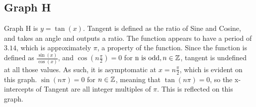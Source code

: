\subsection{Graph H}

Graph H is $y=\tan(x)$.
Tangent is defined as the ratio of Sine and Cosine, and takes an angle and outputs a ratio.
The function appears to have a period of $3.14$, which is approximately $\pi$, a property of the function.
Since the function is defined as $\frac{\sin(x)}{\cos(x)}$, and ${\cos(n{\frac{\pi}{2}})=0}$ for ${\text{n is odd}, n\in \mathbb{Z}}$, tangent is undefined at all those values.
As such, it is asymptomatic at $x={n{\frac{\pi}{2}}}$, which is evident on this graph.
${\sin(n\pi)=0}$ for ${n \in \mathbb{Z}}$, meaning that ${\tan(n{\pi})=0}$, so the x-intercepts of Tangent are all integer multiples of ${\pi}$.
This is reflected on this graph.

